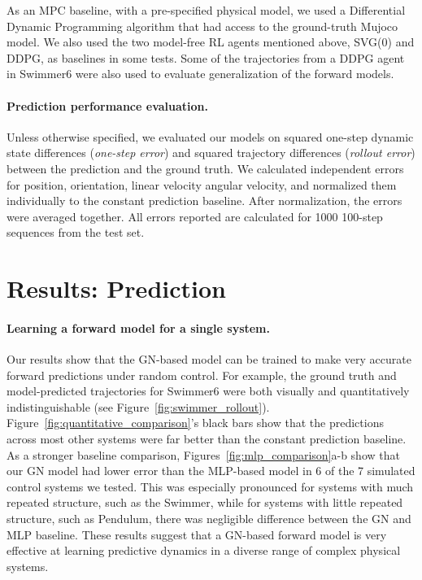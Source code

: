 \documentclass{article}
\begin{document}
As an MPC baseline, with a pre-specified physical model, we used a Differential Dynamic Programming algorithm \citep{tassa2008receding, tassa2014control} that had access to the ground-truth Mujoco model. We also used the two model-free RL agents mentioned above, SVG(0) and DDPG, as baselines in some tests. Some of the trajectories from a DDPG agent in Swimmer6 were also used to evaluate generalization of the forward models.


\paragraph{Prediction performance evaluation.}
Unless otherwise specified, we evaluated our models on squared one-step dynamic state differences (\emph{one-step error}) and squared trajectory differences (\emph{rollout error}) between the prediction and the ground truth.
%
We calculated independent errors for position, orientation, linear velocity angular velocity, and normalized them individually to the constant prediction baseline. After normalization, the errors were averaged together. All errors reported are calculated for 1000 100-step sequences from the test set.


\section{Results: Prediction}
\label{sec:results_prediction}

\paragraph{Learning a forward model for a single system.}
Our results show that the GN-based model can be trained to make very accurate forward predictions under random control.
%
For example, the ground truth and model-predicted trajectories for Swimmer6 were both visually and quantitatively indistinguishable (see Figure~\ref{fig:swimmer_rollout}). 
%
Figure~\ref{fig:quantitative_comparison}'s black bars show that the predictions across most other systems were far better than the constant prediction baseline.
%
As a stronger baseline comparison, Figures~\ref{fig:mlp_comparison}a-b show that our GN model had lower error than the MLP-based model in 6 of the 7 simulated control systems we tested. This was especially pronounced for systems with much repeated structure, such as the Swimmer, while for systems with little repeated structure, such as Pendulum, there was negligible difference between the GN and MLP baseline. These results suggest that a GN-based forward model is very effective at learning predictive dynamics in a diverse range of complex physical systems.
\end{document}

